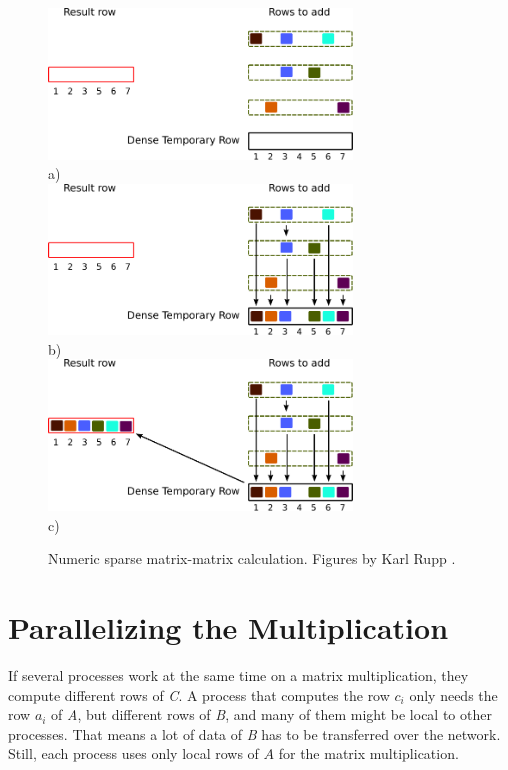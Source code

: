 \begin{figure}[H]
\centering
\includegraphics[width=0.72\textwidth]{spgemm-numeric-2}\\
a)\\
\vspace*{5mm}
\includegraphics[width=0.72\textwidth]{spgemm-numeric-4}\\
b)\\
\vspace*{5mm}
\includegraphics[width=0.72\textwidth]{spgemm-numeric-6}\\
c)\\
\vspace*{5mm}
\caption{Numeric sparse matrix-matrix calculation. Figures by Karl Rupp \cite{karli_LANS_image}.}
\label{fig:spgemm-numeric}
\end{figure}


\section{Parallelizing the Multiplication}

If several processes work at the same time on a matrix multiplication, they compute different rows of \textit{C}. A process that computes the row $c_i$ only needs the row $a_i$ of \textit{A}, but different rows of \textit{B}, and many of them might be local to other processes. That means a lot of data of \textit{B} has to be transferred over the network. Still, each process uses only local rows of $A$ for the matrix multiplication.

